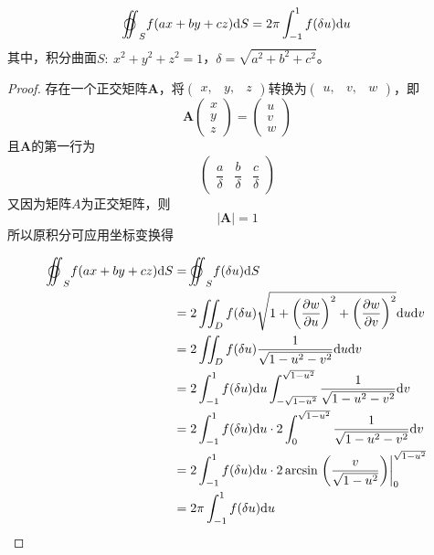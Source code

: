 \begin{theorem}\label{theorem:surface}

    $$\ooint_{S}{f(ax + by + cz)}\diff S = 2\pi\int_{-1}^{1}{f(\delta u)}\diff u$$
    其中，积分曲面$S:\ x^2 + y^2 + z^2 = 1$，$\delta = \sqrt{a^2 + b^2 + c^2}$。

\end{theorem}

\begin{proof}

    存在一个正交矩阵$\boldsymbol{A}$，将$(\begin{smallmatrix} x,& y,& z \end{smallmatrix})$转换为$(\begin{smallmatrix} u,& v,& w \end{smallmatrix})$，即
    $$ \boldsymbol{A}
    \begin{pmatrix}
        x\\
        y\\
        z
    \end{pmatrix} = 
    \begin{pmatrix}
        u\\
        v\\
        w
    \end{pmatrix}$$
    且$\boldsymbol{A}$的第一行为
    $$\begin{pmatrix}
        \dfrac{a}{\delta} & \dfrac{b}{\delta} & \dfrac{c}{\delta}
    \end{pmatrix}$$
    又因为矩阵$A$为正交矩阵，则
    $$|\boldsymbol{A}| = 1$$
    所以原积分可应用坐标变换得
    
    \begin{align*}
        \ooint_{S}{f(ax + by + cz)}\diff S & = \ooint_{S}{f(\delta u)}\diff S \\
        & = 2\iint_{D}{f(\delta u) \sqrt{1 + \left( \dfrac{\partial w}{\partial u} \right)^2 + \left( \dfrac{\partial w}{\partial v}\right)^2}}\diff u \diff v\\
        & = 2\iint_{D}{f(\delta u) \dfrac{1}{\sqrt{1 - u^2 - v^2}}}\diff u \diff v \\
        & = 2\int_{-1}^{1}{f(\delta u)}\diff u \int_{-\sqrt{1 - u^2}}^{\sqrt{1 - u^2}}{\dfrac{1}{\sqrt{1 - u^2 - v^2}}}\diff v \\
        & = 2\int_{-1}^{1}{f(\delta u)}\diff u \cdot 2 \int_{0}^{\sqrt{1 - u^2}}{\dfrac{1}{\sqrt{1 - u^2 - v^2}}}\diff v \\
        & = 2\int_{-1}^{1}{f(\delta u)}\diff u \cdot 2\arcsin\left.\left(\dfrac{v}{\sqrt{1 - u^2}}\right) \right|_{0}^{\sqrt{1 - u^2}} \\
        & = 2\pi\int_{-1}^{1}{f(\delta u)}\diff u
    \end{align*}

\end{proof}

